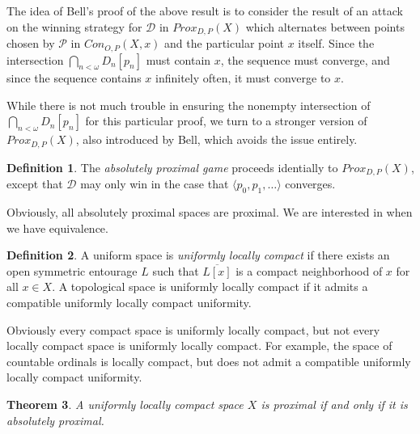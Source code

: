 \documentclass{amsart}
\newtheorem{thm}{Theorem}[section]
\theoremstyle{definition}
\newtheorem{defn}[thm]{Definition}
\theoremstyle{remark}
\newcommand{\<}{\langle}
\renewcommand{\>}{\rangle}
\newcommand{\cl}[1]{\overline{#1}}
\newcommand{\proxgame}[1]{Prox_{D,P}(#1)}
\newcommand{\congame}[2]{Con_{O,P}(#1,#2)}
\newcommand{\pl}[1]{\mathscr{#1}}
\newcommand{\term}{\textit}
\begin{document}
   The idea of Bell's proof of the above result is to consider the result of an attack on the winning strategy for $\pl D$ in $\proxgame{X}$ which alternates between points chosen by $\pl P$ in $\congame{X}{x}$ and the particular point $x$ itself. Since the intersection $\bigcap_{n<\omega} D_n[p_n]$ must contain $x$, the sequence must converge, and since the sequence contains $x$ infinitely often, it must converge to $x$.


While there is not much trouble in ensuring the nonempty intersection of\\ $\bigcap_{n<\omega} D_n[p_n]$ for this particular proof, we turn to a stronger version of $\proxgame{X}$, also introduced by Bell, which avoids the issue entirely.

\begin{defn}
  The \term{absolutely proximal game}  proceeds identially to $\proxgame{X}$, except that $\pl D$ may only win in the case that $\<p_0,p_1,\dots\>$ converges.
\end{defn}

Obviously, all absolutely proximal spaces are proximal. We are interested in when we have equivalence.

\begin{defn}
  A uniform space is \term{uniformly locally compact} if there exists an open symmetric entourage $L$ such that $\cl{L[x]}$ is a compact neighborhood of $x$ for all $x\in X$.  A topological space is uniformly locally compact if it admits a compatible uniformly locally compact uniformity.
\end{defn}


Obviously every compact space is uniformly locally compact, but not every locally compact space is uniformly locally compact.  For example, the space of countable ordinals is locally compact, but does not admit a compatible uniformly locally compact uniformity.

\begin{thm}
  A uniformly locally compact space $X$ is proximal if and only if it is absolutely proximal.
\end{thm}
\end{document}
